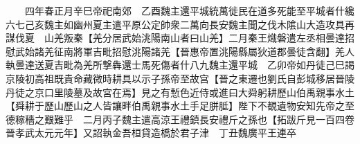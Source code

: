 　　四年春正月辛巳帝祀南郊　乙酉魏主還平城統萬徙民在道多死能至平城者什纔六七己亥魏主如幽州夏主遣平原公定帥衆二萬向長安魏主聞之伐木隂山大造攻具再謀伐夏　山羌叛秦【羌分居武始洮陽南山者曰山羌】二月秦王熾磐遣左丞相曇達招慰武始諸羌征南將軍吉毗招慰洮陽諸羌【晉惠帝置洮陽縣屬狄道郡曇徒含翻】羌人執曇達送夏吉毗為羌所撃犇還士馬死傷者什八九魏主還平城　乙卯帝如丹徒己巳謁京陵初高祖既貴命藏微時耕具以示子孫帝至故宫【晉之東遷也劉氏自彭城移居晉陵丹徒之京口里陵墓及故宮在焉】見之有慙色近侍或進曰大舜躬耕歷山伯禹親事水土【舜耕于歷山歷山之人皆讓畔伯禹親事水土手足胼胝】陛下不覩遺物安知先帝之至德稼穡之艱難乎　二月丙子魏主遣高涼王禮鎮長安禮斤之孫也【拓跋斤見一百四卷晉孝武太元元年】又詔執金吾桓貸造橋於君子津　丁丑魏廣平王連卒　